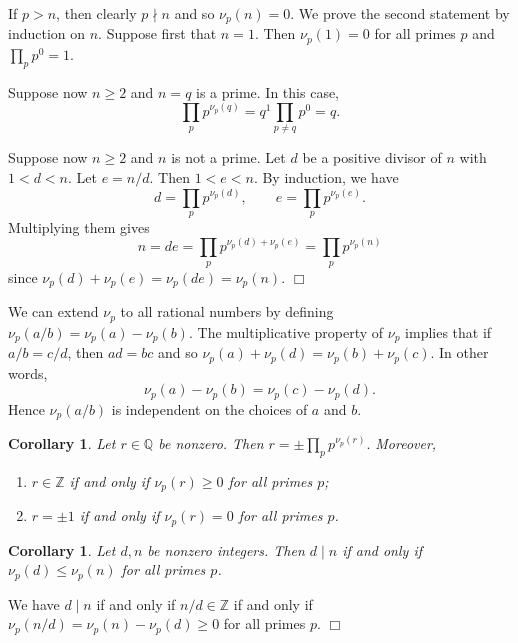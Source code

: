 \documentclass{article}
\def\Z{{\mathbb Z}}
\def\Q{{\mathbb Q}}
\def\Z{{\mathbb Z}}
\def\Q{{\mathbb Q}}
\newtheorem{cor}[subsection]{Corollary}
\newenvironment{proof}{\noindent {\bf Proof:}}{$\Box$ \vspace{2 ex}}
\begin{document}
\begin{proof}
    If $p>n$, then clearly $p\nmid n$ and so $\nu_p(n)=0$.
    We prove the second statement by induction on $n$. Suppose first that $n = 1$. Then $\nu_p(1) = 0$ for all primes $p$ and $\prod_p p^0 = 1$.

    Suppose now $n\geq 2$ and $n=q$ is a prime. In this case, $$\prod_p p^{\nu_p(q)} = q^1 \prod_{p\neq q} p^0 = q.$$

    Suppose now $n\geq2$ and $n$ is not a prime. Let $d$ be a positive divisor of $n$ with $1<d<n$. Let $e = n/d$. Then $1<e<n$. By induction, we have $$d = \prod_{p}p^{\nu_p(d)},\qquad e = \prod_{p}p^{\nu_p(e)}.$$ Multiplying them gives $$n = de = \prod_p p^{\nu_p(d)+\nu_p(e)} = \prod_p p^{\nu_p(n)}$$
    since $\nu_p(d)+\nu_p(e) = \nu_p(de) = \nu_p(n).$
\end{proof}

We can extend $\nu_p$ to all rational numbers by defining $\nu_p(a/b) = \nu_p(a) - \nu_p(b).$ The multiplicative property of $\nu_p$ implies that if $a/b = c/d$, then $ad = bc$ and so $\nu_p(a) + \nu_p(d) = \nu_p(b) + \nu_p(c)$. In other words,  $$\nu_p(a) - \nu_p(b) = \nu_p(c) - \nu_p(d).$$
Hence $\nu_p(a/b)$ is independent on the choices of $a$ and $b$.

\begin{cor}
    Let $r\in\Q$ be nonzero. Then $\displaystyle r = \pm\prod_p p^{\nu_p(r)}.$ Moreover,
    \begin{enumerate}
        \item $r\in\Z$ if and only if $\nu_p(r)\geq 0$ for all primes $p$;
        \item $r = \pm 1$ if and only if $\nu_p(r) = 0$ for all primes $p$.
    \end{enumerate}
\end{cor}

\begin{cor}
    Let $d,n$ be nonzero integers. Then $d\mid n$ if and only if $\nu_p(d)\leq\nu_p(n)$ for all primes $p$.
\end{cor}

\begin{proof}
\begin{comment}
    Suppose $d\mid n$. Write $n = de$ for some nonzero integer $e$. Then for any primes $p$, $$\nu_p(n) = \nu_p(d) + \nu_p(d)\geq\nu_p(d).$$
    Conversely, suppose $\nu_p(d)\leq\nu_p(n)$ for all primes $p$. Let $m_p = \nu_p(n) - \nu_p(d)$. Then $m_p\geq 0$ for all primes $p$, and $m_p\leq \nu_p(n) = 0$ for all but finitely primes $p$. Then $m = \prod_p p^{m_p}\in\Z$ and $n = dm$.
\end{comment}
    We have $d\mid n$ if and only if $n/d\in\Z$ if and only if $\nu_p(n/d) = \nu_p(n) - \nu_p(d)\geq0$ for all primes $p$.
\end{proof}
\end{document}
